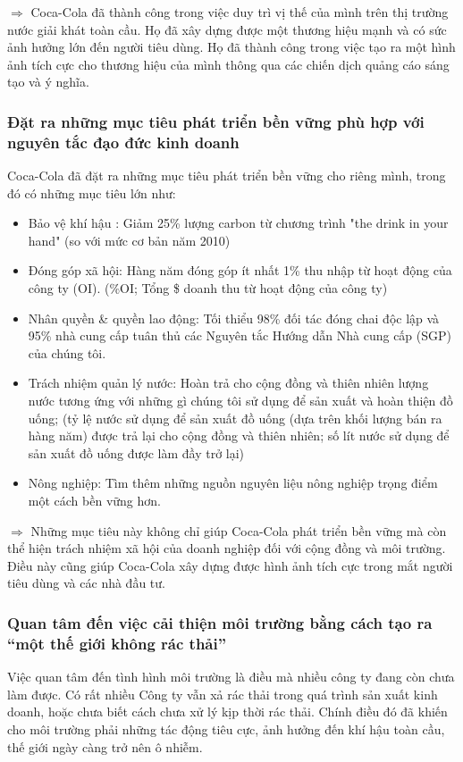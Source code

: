 \documentclass{article}
\begin{document}
    \vspace{0.2cm}
    $\Rightarrow$ Coca-Cola đã thành công trong việc duy trì vị thế của mình trên thị trường nước giải khát toàn cầu. Họ đã xây dựng được một thương hiệu mạnh và có sức ảnh hưởng lớn đến người tiêu dùng. Họ đã thành công trong việc tạo ra một hình ảnh tích cực cho thương hiệu của mình thông qua các chiến dịch quảng cáo sáng tạo và ý nghĩa.

    \subsubsection{Đặt ra những mục tiêu phát triển bền vững phù hợp với nguyên tắc đạo đức kinh doanh}
    \vspace{0.2cm}
    Coca-Cola đã đặt ra những mục tiêu phát triển bền vững cho riêng mình, trong đó có những mục tiêu lớn như:
    \begin{itemize}
        \item Bảo vệ khí hậu : Giảm 25\% lượng carbon từ chương trình "the drink in your hand"  (so với mức cơ bản năm 2010)
        \item Đóng góp xã hội: Hàng năm đóng góp ít nhất 1\% thu nhập từ hoạt động của công ty (OI). (\%OI; Tổng \$ doanh thu từ hoạt động của công ty)
        \item Nhân quyền \& quyền lao động: Tối thiểu 98\% đối tác đóng chai độc lập và 95\% nhà cung cấp tuân thủ các Nguyên tắc Hướng dẫn Nhà cung cấp (SGP) của chúng tôi.
        \item Trách nhiệm quản lý nước: Hoàn trả cho cộng đồng và thiên nhiên lượng nước tương ứng với những gì chúng tôi sử dụng để sản xuất và hoàn thiện đồ uống; (tỷ lệ nước sử dụng để sản xuất đồ uống (dựa trên khối lượng bán ra hàng năm) được trả lại cho cộng đồng và thiên nhiên; số lít nước sử dụng để sản xuất đồ uống được làm đầy trở lại)
        \item Nông nghiệp: Tìm thêm những nguồn nguyên liệu nông nghiệp trọng điểm một cách bền vững hơn.
    \end{itemize}

    \vspace{0.2cm}
    $\Rightarrow$ Những mục tiêu này không chỉ giúp Coca-Cola phát triển bền vững mà còn thể hiện trách nhiệm xã hội của doanh nghiệp đối với cộng đồng và môi trường. Điều này cũng giúp Coca-Cola xây dựng được hình ảnh tích cực trong mắt người tiêu dùng và các nhà đầu tư.
    
    \subsubsection{Quan tâm đến việc cải thiện môi trường bằng cách tạo ra “một thế giới không rác thải”}
    \vspace{0.2cm}
    Việc quan tâm đến tình hình môi trường là điều mà nhiều công ty đang còn chưa làm được. Có rất nhiều Công ty vẫn xả rác thải trong quá trình sản xuất kinh doanh, hoặc chưa biết cách chưa xử lý kịp thời rác thải. Chính điều đó đã khiến cho môi trường phải những tác động tiêu cực, ảnh hưởng đến khí hậu toàn cầu, thế giới ngày càng trở nên ô nhiễm. 
\end{document}
